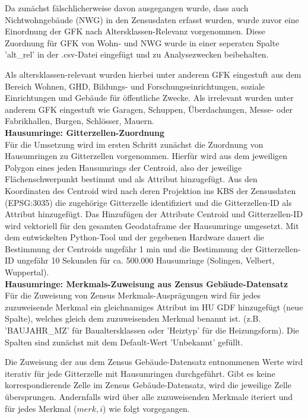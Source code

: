 			Da zunächst fälschlicherweise davon ausgegangen wurde, dass auch Nichtwohngebäude (NWG) in den Zensusdaten erfasst wurden, wurde zuvor eine Einordnung der GFK nach Altersklassen-Relevanz vorgenommen. Diese Zuordnung für GFK von Wohn- und NWG wurde in einer seperaten Spalte 'alt\_rel' in der .csv-Datei eingefügt und zu Analysezwecken beibehalten. 
			
			Als altersklassen-relevant wurden hierbei unter anderem GFK eingestuft aus dem Bereich Wohnen, GHD, Bildungs- und Forschungseinrichtungen, soziale Einrichtungen und Gebäude für öffentliche Zwecke. Als irrelevant wurden unter anderem GFK eingestuft wie Garagen, Schuppen, Überdachungen, Messe- oder Fabrikhallen, Burgen, Schlösser, Mauern. \\
			
			\textbf{Hausumringe: Gitterzellen-Zuordnung}\\
			Für die Umsetzung wird im ersten Schritt zunächst die Zuordnung von Hausumringen zu Gitterzellen vorgenommen. Hierfür wird aus dem jeweiligen Polygon eines jeden Hausumrings der Centroid, also der jeweilige Flächenschwerpunkt bestimmt und als Attribut hinzugefügt. Aus den Koordinaten des Centroid wird nach deren Projektion ins KBS der Zensusdaten (EPSG:3035) die zugehörige Gitterzelle identifiziert und die Gitterzellen-ID als Attribut hinzugefügt. Das Hinzufügen der Attribute Centroid und Gitterzellen-ID wird vektoriell für den gesamten Geodataframe der Hausumringe umgesetzt. Mit dem entwickelten Python-Tool und der gegebenen Hardware dauert die Bestimmung der Centroids ungefähr 1 min und die Bestimmung der Gitterzellen-ID ungefähr 10 Sekunden für ca. 500.000 Hausumringe (Solingen, Velbert, Wuppertal). \\
			
			
			\textbf{Hausumringe: Merkmals-Zuweisung aus Zensus Gebäude-Datensatz}\\
			Für die Zuweisung von Zensus Merkmals-Ausprägungen wird für jedes zuzuweisende Merkmal ein gleichnamiges Attribut im HU GDF hinzugefügt (neue Spalte), welches gleich dem zuzuweisenden Merkmal benannt ist. (z.B. 'BAUJAHR\_MZ' für Baualtersklassen oder 'Heiztyp' für die Heizungsform). Die Spalten sind zunächst mit dem Default-Wert 'Unbekannt' gefüllt. 
			
			Die Zuweisung der aus dem Zensus Gebäude-Datensatz entnommenen Werte wird iterativ für jede Gitterzelle mit Hausumringen durchgeführt. Gibt es keine korrespondierende Zelle im Zensus Gebäude-Datensatz, wird die jeweilige Zelle übersprungen. Andernfalls wird über alle zuzuweisenden Merkmale iteriert und für jedes Merkmal ($merk,i$) wie folgt vorgegangen. 
			
